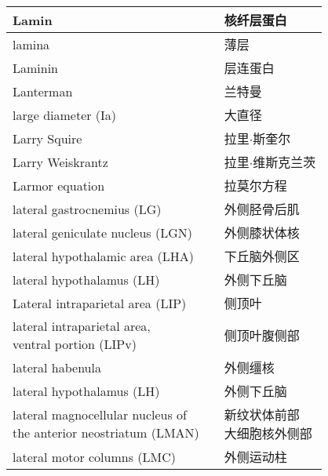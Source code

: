 \begin{longtable}{lll}
	\midrule
	Lamin     &&  核纤层蛋白  \\
	
	\midrule
	lamina     &&  薄层  \\
	
	\midrule
	Laminin     &&  层连蛋白  \\
	
	\midrule
	Lanterman     &&  兰特曼  \\
	
	\midrule
	large diameter (Ia)     &&  大直径  \\
	
	\midrule
	Larry Squire   && 拉里$\cdot$斯奎尔  \\
	
	\midrule
	Larry Weiskrantz   && 拉里$\cdot$维斯克兰茨  \\
	
	\midrule
	Larmor equation   && 拉莫尔方程  \\
	
	\midrule
	lateral gastrocnemius (LG)  && 外侧胫骨后肌  \\
	
	\midrule
	lateral geniculate nucleus (LGN)   && 外侧膝状体核  \\
	
	\midrule
	lateral hypothalamic area (LHA)  && 下丘脑外侧区  \\
	
	\midrule
	lateral hypothalamus (LH)  && 外侧下丘脑  \\
	
	\midrule
	Lateral intraparietal area (LIP)   && 侧顶叶  \\
	
	\midrule
	\makecell[l]{lateral intraparietal area, \\ventral portion} (LIPv)  && 侧顶叶腹侧部  \\
	
	\midrule
	lateral habenula   && 外侧缰核  \\
	
	\midrule
	lateral	hypothalamus (LH)  && 外侧下丘脑  \\
	
	\midrule
	\makecell[l]{lateral magnocellular nucleus of \\ the anterior neostriatum (LMAN)}  && \makecell[l]{新纹状体前部\\大细胞核外侧部}  \\
	
	\midrule
	lateral motor columns (LMC)   && 外侧运动柱  \\
	

\end{longtable}
